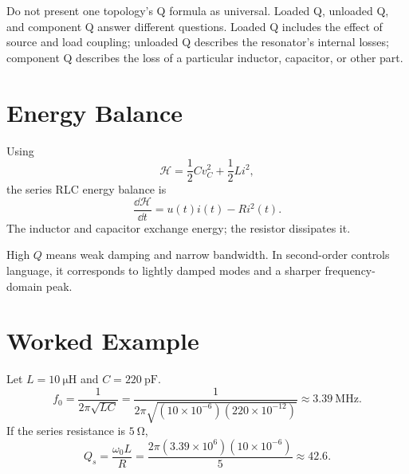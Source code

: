 \begin{mistakebox}
Do not present one topology's Q formula as universal. Loaded Q, unloaded Q, and
component Q answer different questions. Loaded Q includes the effect of source
and load coupling; unloaded Q describes the resonator's internal losses;
component Q describes the loss of a particular inductor, capacitor, or other
part.
\end{mistakebox}

\section{Energy Balance}
Using
\[
\mathcal{H}=\frac{1}{2}Cv_C^2+\frac{1}{2}Li^2,
\]
the series RLC energy balance is
\[
\frac{\dd\mathcal{H}}{\dd t}=u(t)i(t)-Ri^2(t).
\]
The inductor and capacitor exchange energy; the resistor dissipates it.

\begin{controlsbox}
High \(Q\) means weak damping and narrow bandwidth. In second-order controls
language, it corresponds to lightly damped modes and a sharper frequency-domain
peak.
\end{controlsbox}

\section{Worked Example}
\enlargethispage{3\baselineskip}
Let \(L=\SI{10}{\micro\henry}\) and \(C=\SI{220}{\pico\farad}\).
\[
f_0=\frac{1}{2\pi\sqrt{LC}}
=\frac{1}{2\pi\sqrt{(10\times10^{-6})(220\times10^{-12})}}
\approx \SI{3.39}{\mega\hertz}.
\]
If the series resistance is \(\SI{5}{\ohm}\),
\[
Q_s=\frac{\omega_0L}{R}
=\frac{2\pi(3.39\times10^6)(10\times10^{-6})}{5}
\approx 42.6.
\]
